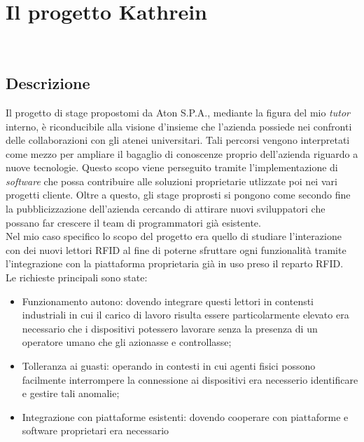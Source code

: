 
\chapter{Il progetto Kathrein}
\label{cap:lo-stage}

\\

\section{Descrizione}
Il progetto di stage propostomi da Aton S.P.A., mediante la figura del mio \emph{tutor} interno, è riconducibile alla visione d'insieme che l'azienda possiede
nei confronti delle collaborazioni con gli atenei universitari. Tali percorsi vengono interpretati come mezzo per ampliare il bagaglio di conoscenze proprio 
dell'azienda riguardo a nuove tecnologie. Questo scopo viene perseguito tramite l'implementazione di \emph{software} che possa contribuire alle soluzioni 
proprietarie utlizzate poi nei vari progetti cliente. Oltre a questo, gli stage proprosti si pongono come secondo fine la pubblicizzazione dell'azienda 
cercando di attirare nuovi sviluppatori che possano far crescere il team di programmatori già esistente. \\
Nel mio caso specifico lo scopo del progetto era quello di studiare l'interazione con dei nuovi lettori RFID al fine di poterne sfruttare ogni funzionalità 
tramite l'integrazione con la piattaforma proprietaria già in uso preso il reparto RFID. \\
Le richieste principali sono state:
\begin{itemize}
    \item Funzionamento autono: dovendo integrare questi lettori in contensti industriali in cui il carico di lavoro risulta essere particolarmente elevato
    era necessario che i dispositivi potessero lavorare senza la presenza di un operatore umano che gli azionasse e controllasse;
    \item Tolleranza ai guasti: operando in contesti in cui agenti fisici possono facilmente interrompere la connessione ai dispositivi era necesserio
    identificare e gestire tali anomalie;
    \item Integrazione con piattaforme esistenti: dovendo cooperare con piattaforme e software proprietari era necessario
\end{itemize} 
